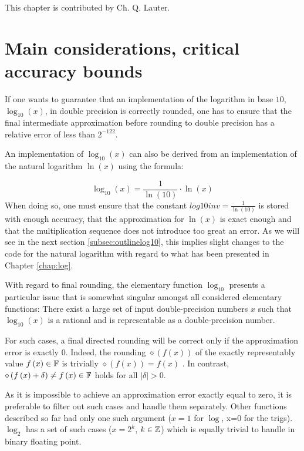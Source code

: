 This chapter is contributed by Ch. Q. Lauter.

\section{Main considerations, critical accuracy bounds}\label{subsec:criticalboundslog10}
If one wants to guarantee that an implementation of the logarithm in
base $10$, $\log_{10}\left( x \right)$, in double precision is
correctly rounded, one has to ensure that the final intermediate
approximation before rounding to double precision has a relative error
of less than $2^{-122}$.

An implementation of $\log_{10}\left(x\right)$ can also be derived from an
implementation of the natural logarithm $\ln\left(x\right)$ using the formula:

\begin{equation}
  \log_{10}\left( x \right) = \frac{1}{\ln\left( 10 \right)} \cdot
\ln\left( x \right)\label{eq:log10}
\end{equation}
When doing so, one must ensure that the constant
$\mathit{log10inv} = \frac{1}{\ln\left(10\right)}$ is stored with
enough accuracy, that the approximation for $\ln\left( x \right)$ is
exact enough and that the multiplication sequence does not introduce
too great an error. As we will see in the next section
\ref{subsec:outlinelog10}, this implies slight changes to the code for
the natural logarithm with regard to what has been presented in
 Chapter \ref{chap:log}.

 With regard to final rounding, the elementary function $\log_{10}$
 presents a particular issue that is somewhat singular amongst all
 considered elementary functions: There exist a large set of input
 double-precision numbers $x$ such that $\log_{10}(x)$ is a rational
 and is representable as a double-precision number.

 For such cases, a final directed rounding will be correct only if the
 approximation error is exactly $0$.
 Indeed, the rounding $\diamond\left( f\left( x \right) \right)$ of
 the exactly representably value $f\left(x\right) \in \mathbb {F}$ is trivially
 $\diamond\left( f\left( x \right) \right) = f\left( x \right)$
 \cite{IEEE754}. In contrast, $\diamond\left( f\left( x \right) +
   \delta \right) \not = f\left( x \right) \in \mathbb {F}$ holds for all
 $\left \vert \delta \right \vert > 0$.

 As it is impossible to achieve an approximation error exactly equal
 to zero, it is preferable to filter out such cases and handle them
 separately. Other functions described so far had only one such argument
 ($x=1$ for $\log$, x=0 for the trigs). $\log_2$ has a set of such
 cases ($x = 2^k$, $k \in \mathbb {Z}$) which is equally trivial to handle in
 binary floating point.


